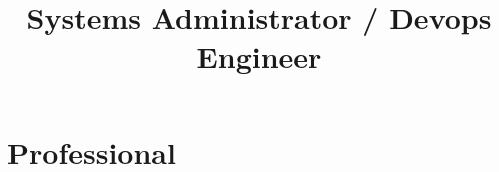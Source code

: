 \documentclass[10pt, a4paper]{moderncv}
\title{Systems Administrator / Devops Engineer}
\begin{document}
\maketitle
\vspace*{-2.5\baselineskip}



\section{Professional}
\end{document}
